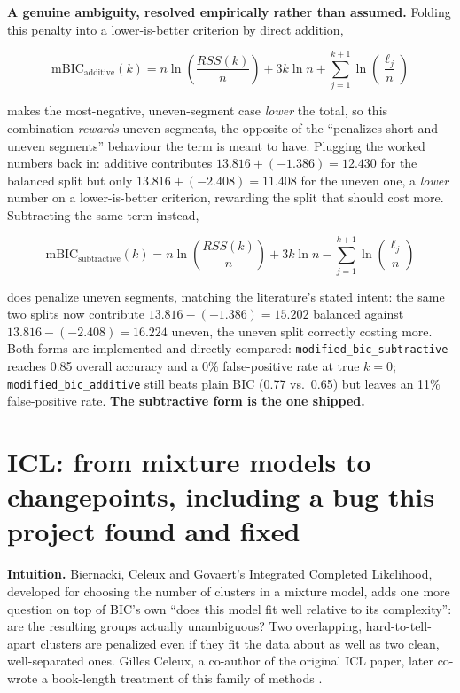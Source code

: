 \documentclass[11pt]{article}
\newcommand{\code}[1]{\texttt{#1}}
\begin{document}
\textbf{A genuine ambiguity, resolved empirically rather than assumed.}
Folding this penalty into a lower-is-better criterion by direct addition,

\begin{equation}
\mathrm{mBIC}_{\text{additive}}(k) = n \ln\!\left(\frac{RSS(k)}{n}\right) + 3k \ln n + \sum_{j=1}^{k+1} \ln\!\left(\frac{\ell_j}{n}\right)
\end{equation}

makes the most-negative, uneven-segment case \emph{lower} the total, so this
combination \emph{rewards} uneven segments, the opposite of the
``penalizes short and uneven segments'' behaviour the term is meant to
have. Plugging the worked numbers back in: additive contributes
$13.816 + (-1.386) = 12.430$ for the balanced split but only $13.816 +
(-2.408) = 11.408$ for the uneven one, a \emph{lower} number on a
lower-is-better criterion, rewarding the split that should cost
more. Subtracting the same term instead,

\begin{equation}
\mathrm{mBIC}_{\text{subtractive}}(k) = n \ln\!\left(\frac{RSS(k)}{n}\right) + 3k \ln n - \sum_{j=1}^{k+1} \ln\!\left(\frac{\ell_j}{n}\right)
\end{equation}

does penalize uneven segments, matching the literature's stated intent:
the same two splits now contribute $13.816 - (-1.386) = 15.202$
balanced against $13.816 - (-2.408) = 16.224$ uneven, the uneven split
correctly costing more.
Both forms are implemented and directly compared:
\code{modified\_bic\_subtractive} reaches 0.85 overall accuracy and a 0\%
false-positive rate at $\text{true } k = 0$; \code{modified\_bic\_additive}
still beats plain BIC (0.77 vs.\ 0.65) but leaves an 11\% false-positive
rate. \textbf{The subtractive form is the one shipped.}

\section{ICL: from mixture models to changepoints, including a bug this project found and fixed}
\label{sec:icl}

\textbf{Intuition.} Biernacki, Celeux and Govaert's Integrated Completed
Likelihood, developed for choosing the number of clusters in a mixture
model, adds one more question on top of BIC's own ``does this model fit
well relative to its complexity'': are the resulting groups actually
unambiguous? Two overlapping, hard-to-tell-apart clusters
are penalized even if they fit the data about as well as two clean,
well-separated ones. Gilles Celeux, a co-author of the original ICL paper,
later co-wrote a book-length treatment of this family of methods
\citep{bouveyron2021mbc}.
\end{document}
